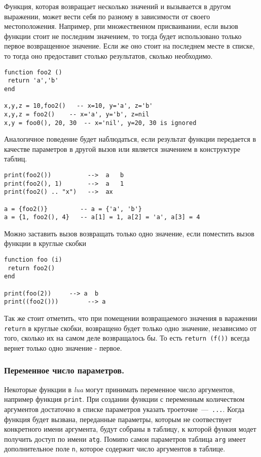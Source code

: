 Функция, которая возвращает несколько значений и вызывается в другом выражении, может вести себя по разному в зависимости от своего местоположения. Например, рпи множественном присваивании, если вызов функции стоит не последним значением, то тогда будет использовано только первое возвращенное значение. Если же оно стоит на последнем месте в списке, то тогда оно предоставит столько результатов, сколько необходимо.

\begin{lstlisting}
function foo2 ()
 return 'a','b' 
end

x,y,z = 10,foo2()   -- x=10, y='a', z='b'
x,y,z = foo2()    -- x='a', y='b', z=nil
x,y = foo0(), 20, 30  -- x='nil', y=20, 30 is ignored

\end{lstlisting}

Аналогичное поведение будет наблюдаться, если результат функции передается в качестве параметров в другой вызов или является значением в конструктуре таблиц.

\begin{lstlisting}
print(foo2())          -->  a   b
print(foo2(), 1)       -->  a   1
print(foo2() .. "x")   -->  ax  

a = {foo2()}         -- a = {'a', 'b'}
a = {1, foo2(), 4}   -- a[1] = 1, a[2] = 'a', a[3] = 4
\end{lstlisting}

Можно заставить вызов возвращать только одно значение, если поместить вызов функции в круглые скобки

\begin{lstlisting}
function foo (i)
 return foo2()
end

print(foo(2))     --> a  b
print((foo2()))        --> a
\end{lstlisting}

Так же стоит отметить, что при помещении возвращаемого значения в варажении \lstinline{return} в круглые скобки, возвращено будет только одно значение, независимо от того, сколько их на самом деле возвращалось бы. То есть \lstinline{return (f())} всегда вернет только одно значение - первое. 

\subsubsection{Переменное число параметров.}

Некоторые функции в \emph{lua} могут принимать переменное число аргументов, например функция \lstinline{print}. При создании функции с переменным количеством аргументов достаточно в списке параметров указать троеточие~---~\lstinline{...}.  Когда функция будет вызвана, переданные параметры, которым не соотвествует конкретного имени аргумента, будут собраны в таблицу, к которой функия модет получить доступ по имени \lstinline{atg}. Помипо самои параметров таблица \lstinline{arg} имеет дополнительное поле \lstinline{n}, которое содержит число аргументов в таблице. 

